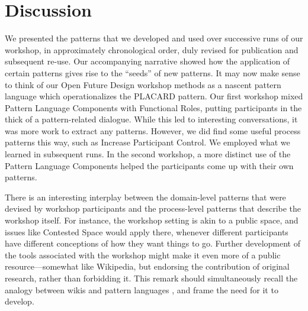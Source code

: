 \documentclass[acmlarge,timestamp]{acmart}
\begin{document}

\section{Discussion}

We presented the patterns that we developed and used over successive
runs of our workshop, in approximately chronological order, duly
revised for publication and subsequent re-use.  Our accompanying
narrative showed how the application of certain patterns gives rise to
the ``seeds'' of new patterns.  It may now make sense to think of our
Open Future Design workshop methods as a nascent pattern language
which operationalizes the PLACARD pattern.  Our first workshop mixed
{\sc Pattern Language Components} with {\sc Functional Roles}, putting
participants in the thick of a pattern-related dialogue.  While this
led to interesting conversations, it was more work to extract any
patterns.  However, we did find some useful process patterns this way,
such as {\sc Increase Participant Control}.  We employed what we
learned in subsequent runs.  In the second workshop, a more distinct
use of the {\sc Pattern Language Components} helped the participants
come up with their own patterns.

There is an interesting interplay between the domain-level patterns
that were devised by workshop participants and the process-level
patterns that describe the workshop itself.  For instance, the
workshop setting is akin to a public space, and issues like {\sc
  Contested Space} would apply there, whenever different participants
have different conceptions of how they want things to go.  Further
development of the tools associated with the workshop might make it
even more of a public resource—somewhat like Wikipedia, but endorsing
the contribution of original research, rather than forbidding it.
This remark should simultaneously recall the analogy between wikis and
pattern languages \cite{cunningham2013a}, and frame the need for it to
develop.
\end{document}
